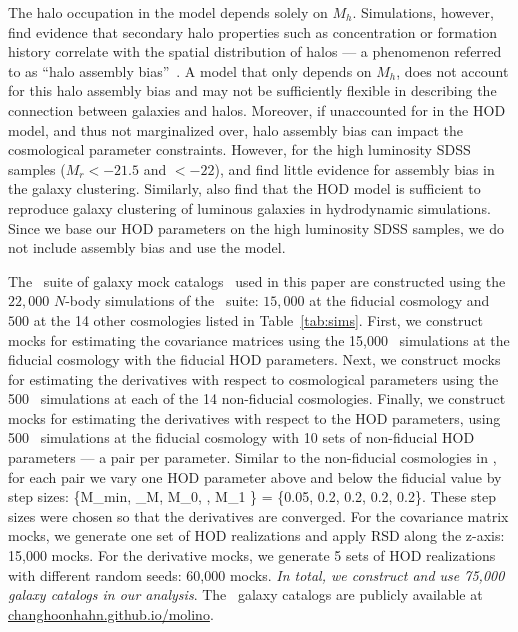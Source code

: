 The halo occupation in the \cite{zheng2007} model depends solely on $M_h$. 
Simulations, however, find evidence that secondary halo properties such as
concentration or formation history correlate with the spatial distribution of
halos --- a phenomenon referred to as ``halo assembly bias''~\citep[\eg][]{sheth2004,
gao2005, harker2006, wechsler2006, dalal2008, wang2009, lacerna2014,
contreras2020, hadzhiyska2020}.
A model that only depends on $M_h$, does not account for this halo assembly 
bias and may not be sufficiently flexible in describing the connection between 
galaxies and halos. Moreover, if unaccounted for in the HOD model, and thus 
not marginalized over, halo assembly bias can impact the cosmological parameter constraints. 
However, for the high luminosity SDSS samples ($M_r < -21.5$  and $<-22$), 
\cite{zentner2016} and \cite{vakili2019} find little evidence for assembly bias 
in the galaxy clustering. Similarly, \cite{beltz-mohrmann2020} also find that
the \cite{zheng2007} HOD model is sufficient to reproduce galaxy clustering of
luminous galaxies in hydrodynamic simulations. Since we base our HOD parameters
on the high luminosity SDSS samples, we do not include assembly bias and use
the \cite{zheng2007} model. 


The \molino~suite of galaxy mock catalogs~\citep{hahn2020a} used in this paper 
are constructed using the $22,000$ $N$-body simulations of the \quij~suite: $15,000$ 
at the fiducial cosmology and $500$ at the 14 other cosmologies listed in Table~\ref{tab:sims}.
First, we construct mocks for estimating the
covariance matrices using the 15,000 \quij~simulations at the fiducial cosmology with
the fiducial HOD parameters. Next, we construct mocks for estimating the
derivatives with respect to cosmological parameters using the 500
\quij~simulations at each of the 14 non-fiducial cosmologies. Finally, we construct mocks for
estimating the derivatives with respect to the HOD parameters, using 500 
\quij~simulations at the fiducial cosmology with 10 sets of non-fiducial HOD
parameters --- a pair per parameter. Similar to the non-fiducial cosmologies in
\quij, for each pair we vary one HOD parameter above and below the fiducial
value by step sizes:
\beq
\{\Delta \log M_{\rm min}, \Delta \sigma_{\log M}, \Delta \log M_0, \Delta \alpha,
\Delta \log M_1 \} = \{0.05, 0.2, 0.2, 0.2, 0.2\}.
\eeq
These step sizes were chosen so that the derivatives are converged.
For the covariance matrix mocks, we generate one set of HOD realizations and apply 
RSD along the z-axis: 15,000 mocks. For the derivative mocks, we generate 5
sets of HOD realizations with different random seeds: 60,000 mocks. {\em In
total, we construct and use 75,000 galaxy catalogs in our analysis}.
The \molino~galaxy catalogs are publicly available at
\href{changhoonhahn.github.io/molino}{changhoonhahn.github.io/molino}.
